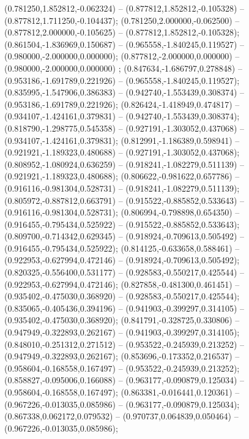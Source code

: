  (0.781250,1.852812,-0.062324) -- (0.877812,1.852812,-0.105328) -- (0.877812,1.711250,-0.104437);
 (0.781250,2.000000,-0.062500) -- (0.877812,2.000000,-0.105625) -- (0.877812,1.852812,-0.105328);
 (0.861504,-1.836969,0.150687) -- (0.965558,-1.840245,0.119527) -- (0.980000,-2.000000,0.000000);
 (0.877812,-2.000000,0.000000) -- (0.980000,-2.000000,0.000000) ;
 (0.847634,-1.686797,0.278848) -- (0.953186,-1.691789,0.221926) -- (0.965558,-1.840245,0.119527);
 (0.835995,-1.547906,0.386383) -- (0.942740,-1.553439,0.308374) -- (0.953186,-1.691789,0.221926);
 (0.826424,-1.418949,0.474817) -- (0.934107,-1.424161,0.379831) -- (0.942740,-1.553439,0.308374);
 (0.818790,-1.298775,0.545358) -- (0.927191,-1.303052,0.437068) -- (0.934107,-1.424161,0.379831);
 (0.812991,-1.186389,0.598941) -- (0.921921,-1.189323,0.480688) -- (0.927191,-1.303052,0.437068);
 (0.808952,-1.080924,0.636259) -- (0.918241,-1.082279,0.511139) -- (0.921921,-1.189323,0.480688);
 (0.806622,-0.981622,0.657786) -- (0.916116,-0.981304,0.528731) -- (0.918241,-1.082279,0.511139);
 (0.805972,-0.887812,0.663791) -- (0.915522,-0.885852,0.533643) -- (0.916116,-0.981304,0.528731);
 (0.806994,-0.798898,0.654350) -- (0.916455,-0.795434,0.525922) -- (0.915522,-0.885852,0.533643);
 (0.809700,-0.714342,0.629345) -- (0.918924,-0.709613,0.505492) -- (0.916455,-0.795434,0.525922);
 (0.814125,-0.633658,0.588461) -- (0.922953,-0.627994,0.472146) -- (0.918924,-0.709613,0.505492);
 (0.820325,-0.556400,0.531177) -- (0.928583,-0.550217,0.425544) -- (0.922953,-0.627994,0.472146);
 (0.827858,-0.481300,0.461451) -- (0.935402,-0.475030,0.368920) -- (0.928583,-0.550217,0.425544);
 (0.835065,-0.405436,0.394196) -- (0.941903,-0.399297,0.314105) -- (0.935402,-0.475030,0.368920);
 (0.841791,-0.328725,0.330806) -- (0.947949,-0.322893,0.262167) -- (0.941903,-0.399297,0.314105);
 (0.848010,-0.251312,0.271512) -- (0.953522,-0.245939,0.213252) -- (0.947949,-0.322893,0.262167);
 (0.853696,-0.173352,0.216537) -- (0.958604,-0.168558,0.167497) -- (0.953522,-0.245939,0.213252);
 (0.858827,-0.095006,0.166088) -- (0.963177,-0.090879,0.125034) -- (0.958604,-0.168558,0.167497);
 (0.863381,-0.016441,0.120361) -- (0.967226,-0.013035,0.085986) -- (0.963177,-0.090879,0.125034);
 (0.867338,0.062172,0.079532) -- (0.970737,0.064839,0.050464) -- (0.967226,-0.013035,0.085986);
